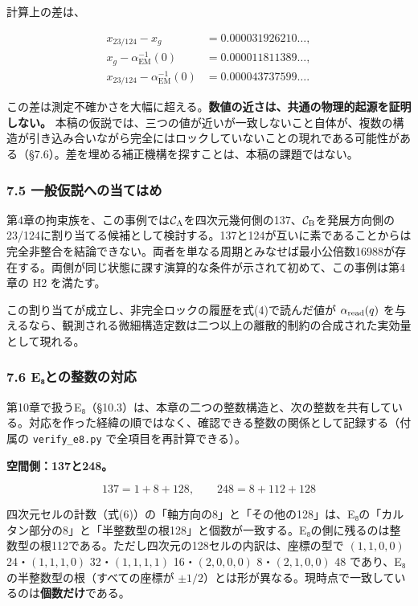 \documentclass[
  a4paper,
]{ltjsarticle}
\begin{document}
計算上の差は、

\[
\begin{aligned}
x_{23/124}-x_g&=0.000031926210\ldots,\\
x_g-\alpha_{\mathrm{EM}}^{-1}(0)&=0.000011811389\ldots,\\
x_{23/124}-\alpha_{\mathrm{EM}}^{-1}(0)&=0.000043737599\ldots.
\end{aligned}
\tag{12}
\]

この差は測定不確かさを大幅に超える。\textbf{数値の近さは、共通の物理的起源を証明しない。}
本稿の仮説では、三つの値が近いが一致しないこと自体が、複数の構造が引き込み合いながら完全にはロックしていないことの現れである可能性がある（§7.6）。差を埋める補正機構を探すことは、本稿の課題ではない。

\subsubsection{7.5
一般仮説への当てはめ}\label{ux4e00ux822cux4eeeux8aacux3078ux306eux5f53ux3066ux306fux3081}

第4章の拘束族を、この事例では\(\mathcal C_{\rm A}\)を四次元幾何側の137、\(\mathcal C_{\rm B}\)を発展方向側の23/124に割り当てる候補として検討する。137と124が互いに素であることからは完全非整合を結論できない。両者を単なる周期とみなせば最小公倍数16988が存在する。両側が同じ状態に課す演算的な条件が示されて初めて、この事例は第4章の
H2 を満たす。

この割り当てが成立し、非完全ロックの履歴を式(4)で読んだ値が
\(\alpha_{\rm read}(q)\)
を与えるなら、観測される微細構造定数は二つ以上の離散的制約の合成された実効量として現れる。

\subsubsection{7.6
E₈との整数の対応}\label{eux2088ux3068ux306eux6574ux6570ux306eux5bfeux5fdc}

第10章で扱うE₈（§10.3）は、本章の二つの整数構造と、次の整数を共有している。対応を作った経緯の順ではなく、確認できる整数の関係として記録する（付属の
\texttt{verify\_\allowbreak{}e8.py} で全項目を再計算できる）。

\textbf{空間側：137と248。}

\[
137=1+8+128,\qquad 248=8+112+128
\tag{12a}
\]

四次元セルの計数（式(6)）の「軸方向の8」と「その他の128」は、E₈の「カルタン部分の8」と「半整数型の根128」と個数が一致する。E₈の側に残るのは整数型の根112である。ただし四次元の128セルの内訳は、座標の型で
\((1,1,0,0)\) 24・\((1,1,1,0)\) 32・\((1,1,1,1)\) 16・\((2,0,0,0)\)
8・\((2,1,0,0)\) 48 であり、E₈の半整数型の根（すべての座標が
\(\pm1/2\)）とは形が異なる。現時点で一致しているのは\textbf{個数だけ}である。
\end{document}
